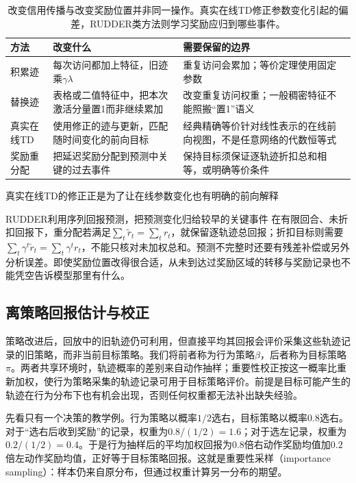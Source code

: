 \begin{table}[t]
  \centering
  \small
  \begin{tabularx}{\linewidth}{>{\raggedright\arraybackslash}p{26mm} >{\raggedright\arraybackslash}X >{\raggedright\arraybackslash}X}
    \toprule
    方法 & 改变什么 & 需要保留的边界 \\
    \midrule
    积累迹 & 每次访问都加上特征，旧迹乘$\gamma\lambda$ & 重复访问会累加；等价定理使用固定参数 \\
    替换迹 & 表格或二值特征中，把本次激活分量置1而非继续累加 & 改变重复访问权重；一般稠密特征不能照搬“置1”语义 \\
    真实在线TD & 使用修正的迹与更新，匹配随时间变化的前向目标 & 经典精确等价针对线性表示的在线前向视图，不是任意网络的代数恒等式 \\
    奖励重分配 & 把延迟奖励分配到预测中关键的过去事件 & 保持目标须保证逐轨迹折扣总和相等，或明确等价条件 \\
    \bottomrule
  \end{tabularx}
  \caption{改变信用传播与改变奖励位置并非同一操作。真实在线TD修正参数变化引起的偏差，RUDDER类方法则学习奖励应归到哪些事件。}
  \label{tab:rl-learning-trace-variants}
\end{table}

真实在线TD的修正正是为了让在线参数变化也有明确的前向解释

RUDDER利用序列回报预测，把预测变化归给较早的关键事件
在有限回合、未折扣回报下，重分配若满足$\sum_t\widetilde r_t=\sum_t r_t$，就保留逐轨迹总回报；折扣目标则需要$\sum_t\gamma^t\widetilde r_t=\sum_t\gamma^t r_t$，不能只核对未加权总和。预测不完整时还要有残差补偿或另外分析误差。即使奖励位置改得很合适，从未到达过奖励区域的转移与奖励记录也不能凭空告诉模型那里有什么。

\subsection{离策略回报估计与校正}
\label{sec:rl-learning-off-policy}

策略改进后，回放中的旧轨迹仍可利用，但直接平均其回报会评价采集这些轨迹记录的旧策略，而非当前目标策略。我们将前者称为行为策略$\beta$，后者称为目标策略$\pi$。两者共享环境时，轨迹概率的差别来自动作抽样；重要性校正按这一概率比重新加权，使行为策略采集的轨迹记录可用于目标策略评价。前提是目标可能产生的轨迹在行为分布下也有机会出现，否则任何权重都无法补出缺失经验。

先看只有一个决策的教学例。行为策略以概率$1/2$选右，目标策略以概率$0.8$选右。对于“选右后收到奖励”的记录，权重为$0.8/(1/2)=1.6$；对于选左记录，权重为$0.2/(1/2)=0.4$。于是行为抽样后的平均加权回报为$0.8$倍右动作奖励均值加$0.2$倍左动作奖励均值，正好等于目标策略回报。这就是重要性采样（importance sampling）：样本仍来自原分布，但通过权重计算另一分布的期望。


